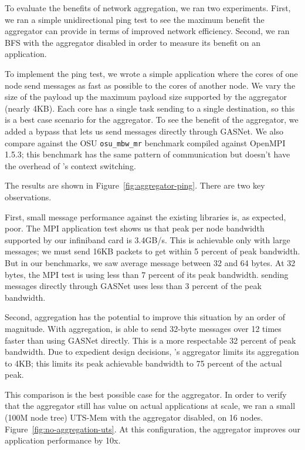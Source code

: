 {To evaluate the benefits of network aggregation, we ran two experiments.
First, we ran a simple unidirectional ping test to see the maximum
benefit the aggregator can provide in terms of improved network
efficiency. Second, we ran BFS with the aggregator disabled in order to
measure its benefit on an application.

To implement the ping test, we wrote a simple \Grappa application where
the cores of one node send messages as fast as possible to the cores
of another node. We vary the size of the payload up the maximum
payload size supported by the aggregator (nearly 4KB). Each core has a
single task sending to a single destination, so this is a best case
scenario for the aggregator. To see the benefit of the aggregator, we
added a bypass that lets us send messages directly through GASNet. We
also compare against the OSU \texttt{osu\_mbw\_mr} benchmark
\cite{osu:mpi}  compiled against OpenMPI 1.5.3; this
benchmark has the same pattern of communication but doesn't have the
overhead of \Grappa's context switching.

The results are shown in Figure~\ref{fig:aggregator-ping}. There are
two key observations.

First, small message performance against the existing libraries is, as expected, poor. The MPI application test shows us that peak per node
bandwidth supported by our infiniband card is 3.4GB/s. This is
achievable only with large messages; we must send 16KB packets to get
within 5 percent of peak bandwidth. But in our benchmarks, we saw
average message between 32 and 64 bytes. At 32 bytes, the MPI test is
using less than 7 percent of its peak bandwidth. \Grappa sending
messages directly through GASNet uses less than 3 percent of the peak
bandwidth.

Second, aggregation has the potential to improve this situation by an
order of magnitude. With aggregation, \Grappa is able to send 32-byte
messages over 12 times faster than using GASNet directly. This is a
more respectable 32 percent of peak bandwidth. Due to expedient design
decisions, \Grappa's aggregator limits its aggregation to 4KB; this
limits its peak achievable bandwidth to 75 percent of the actual
peak.

This comparison is the best possible case for the aggregator. In
order to verify that the aggregator still has value on actual
applications at scale, we ran a small (100M node tree) UTS-Mem
with the aggregator disabled, on 16 nodes.
Figure~\ref{fig:no-aggregation-uts}. At this configuration, the aggregator
improves our application performance by 10x. 

}
